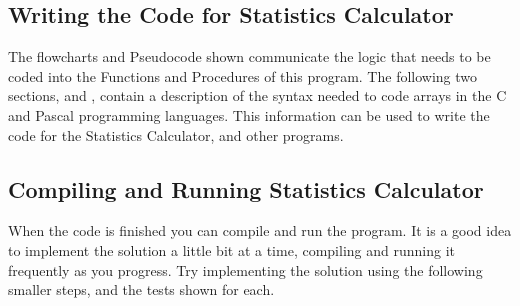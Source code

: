 

\subsection{Writing the Code for Statistics Calculator} %
\label{sub:writing_the_code_for_statistics_calculator}

The flowcharts and Pseudocode shown communicate the logic that needs to be coded into the Functions and Procedures of this program. The following two sections,   and   , contain a description of the syntax needed to code arrays in the C and Pascal programming languages. This information can be used to write the code for the Statistics Calculator, and other programs.

\clearpage
\subsection{Compiling and Running Statistics Calculator} %
\label{sub:compiling_and_running_statistics_calculator}

When the code is finished you can compile and run the program. It is a good idea to implement the solution a little bit at a time, compiling and running it frequently as you progress. Try implementing the solution using the following smaller steps, and the tests shown for each.


